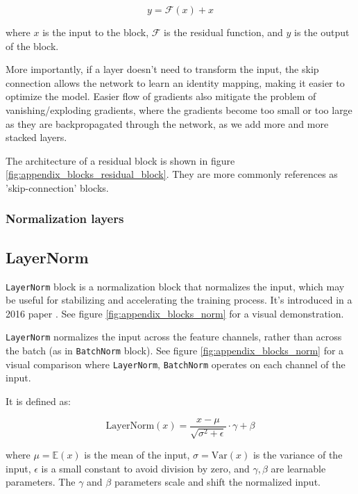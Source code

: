 \begin{equation*}
    y = \mathcal{F} (x) + x
\end{equation*}

where $x$ is the input to the block, $\mathcal{F}$ is the residual function, and $y$ is the output of the block.

More importantly, if a layer doesn't need to transform the input, the skip connection allows the network to learn an identity mapping, making it easier to optimize the model. Easier flow of gradients also mitigate the problem of vanishing/exploding gradients, where the gradients become too small or too large as they are backpropagated through the network, as we add more and more stacked layers.

The architecture of a residual block is shown in figure \ref{fig:appendix_blocks_residual_block}. They are more commonly references as 'skip-connection' blocks.






\subsubsection{Normalization layers}

\subsection*{LayerNorm}

\texttt{LayerNorm} block is a normalization block that normalizes the input, which may be useful for stabilizing and accelerating the training process. It's introduced in a 2016 paper \cite{layernorm}. See figure \ref{fig:appendix_blocks_norm} for a visual demonstration.

\texttt{LayerNorm} normalizes the input across the feature channels, rather than across the batch (as in \texttt{BatchNorm} block). See figure \ref{fig:appendix_blocks_norm} for a visual comparison where \texttt{LayerNorm}, \texttt{BatchNorm} operates on each channel of the input.

It is defined as:

\begin{equation*}
    \text{LayerNorm}(x) = \frac{x - \mu}{\sqrt{\sigma^2 + \epsilon}} \cdot \gamma + \beta
\end{equation*}

where $\mu = \mathbb{E}(x)$ is the mean of the input, $\sigma = \text{Var} (x)$ is the variance of the input, $\epsilon$ is a small constant to avoid division by zero, and $\gamma, \beta$ are learnable parameters. The $\gamma$ and $\beta$ parameters scale and shift the normalized input.

